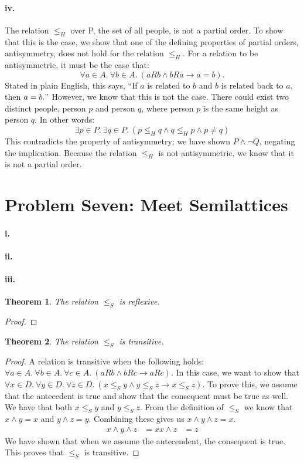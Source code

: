 \documentclass[10pt,letter]{article}
\newtheorem*{thm}{Theorem}
\begin{document}
\paragraph{iv.} The relation $\leq_H$ over P, the set of all people, is not a partial order. To show that this is the case, we show that one of the defining properties of partial orders, antisymmetry, does not hold for the relation $\leq_H$. For a relation to be antisymmetric, it must be the case that:
$$\forall a \in A.\ \forall b \in A.\ (aRb \wedge bRa \rightarrow a=b).$$
Stated in plain English, this says, ``If $a$ is related to $b$ and $b$ is related back to $a$, then $a = b."$ However, we know that this is not the case. There could exist two distinct people, person $p$ and person $q$, where person $p$ is the same height as person $q$. In other words:
$$\exists p \in P.\ \exists q \in P.\ (p \leq_H q \wedge q \leq_H p \wedge p \neq q)$$
This contradicts the property of antisymmetry; we have shown $P \wedge \neg Q$, negating the implication. Because the relation $\leq_H$ is not antisymmetric, we know that it is not a partial order.

\section*{Problem Seven: Meet Semilattices}

\paragraph{i.} 
\paragraph{ii.}
\paragraph{iii.} 
\begin{thm} The relation $\le_S$ is reflexive. \end{thm}
\begin{proof} 
\end{proof}

\begin{thm} The relation $\le_S$ is transitive. \end{thm}
\begin{proof} A relation is transitive when the following holds: $\forall a \in A .\ \forall b \in A .\ \forall c \in A .\ (aRb \wedge bRc \rightarrow aRc)$. In this case, we want to show that $\forall x \in D .\ \forall y \in D .\ \forall z \in D .\ (x \le_S y \wedge y \le_S z \rightarrow x \le_S z)$. To prove this, we assume that the antecedent is true and show that the consequent must be true as well. We have that both $x \le_S y$ and $y \le_S z$. From the definition of $\le_S$ we know that $x \wedge y = x$ and $y \wedge z = y$. Combining these gives us $x \wedge y \wedge z = x$. 
\begin{align*}
x \wedge y \wedge z &= x
x \wedge z &= z
\end{align*}
We have shown that when we assume the antecendent, the consequent is true. This proves that $\le_S$ is transitive.
\end{proof}
\end{document}

